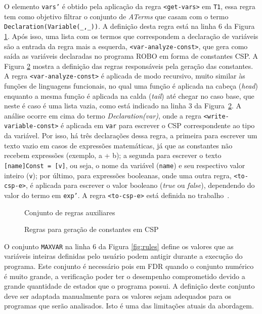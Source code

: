 O elemento \texttt{vars'} é obtido pela aplicação da regra \texttt{<get-vars>} em \texttt{T1}, essa regra tem como objetivo filtrar o conjunto de \textit{ATerms} que casam com o termo \texttt{Declaration(Variable(\_,\_))}. A definição desta regra está na linha 6 da Figura \ref{fig:rules2}. Após isso, uma lista com os termos que correspondem a declaração de variáveis são a entrada da regra mais a esquerda, \texttt{<var-analyze-const>}, que gera como saída  as variáveis declaradas no programa ROBO em forma de constantes CSP. A Figura \ref{fig:rules_constants} mostra a definição das regras responsáveis pela geração das constantes. A regra \texttt{<var-analyze-const>} é aplicada de modo recursivo, muito similar às funções de linguagens funcionais, no qual uma função é aplicada na cabeça (\textit{head}) enquanto a mesma função é aplicada na calda (\textit{tail}) até chegar no caso base, que neste é caso é uma lista vazia, como está indicado na linha 3 da Figura~\ref{fig:rules_constants}. A análise ocorre em cima do termo \textit{Declaration(var)}, onde a regra \texttt{<write-variable-const>} é aplicada em \texttt{var} para escrever o CSP correspondente ao tipo da variável. Por isso, há três declarações dessa regra, a primeira para escrever um texto vazio em casos de expressões matemáticas, já que as constantes não recebem expressões (exemplo, a + b); a segunda para escrever o texto \texttt{[name]Const = [v]}, ou seja, o nome da variável (\texttt{name}) e seu respectivo valor inteiro (\texttt{v}); por último, para expressões booleanas, onde uma outra regra, \texttt{<to-csp-e>}, é aplicada para escrever o valor booleano (\textit{true} ou \textit{false}), dependendo do valor do termo em \texttt{exp'}. A regra \texttt{<to-csp-e>} está definida no trabalho~\cite{nogueira}.

\begin{figure}[!h]
\centering
\caption{Conjunto de regras auxiliares}

\label{fig:rules2}
\end{figure}

\begin{figure}[!h]
\centering
\caption{Regras para geração de constantes em CSP}

\label{fig:rules_constants}
\end{figure}

O conjunto \texttt{MAXVAR} na linha 6 da Figura \ref{fig:rules} define os valores que as variáveis inteiras definidas pelo usuário podem antigir durante a execução do programa. Este conjunto é necessário pois em FDR quando o conjunto numérico é muito grande, a verificação poder ter o desempenho comprometido devido a grande quantidade de estados que o programa possui. A definição deste conjunto deve ser adaptada manualmente para os valores sejam adequados para os programas que serão analisados. Isto é uma das limitações atuais da abordagem.

